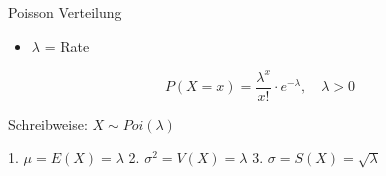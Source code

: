\begin{definition}{Poisson Verteilung}
\begin{itemize}
  \item $\lambda$ = Rate
\end{itemize}

$$P(X=x) = \frac{\lambda^x}{x!} \cdot e^{-\lambda}, \quad \lambda > 0$$

Schreibweise: $X \sim Poi(\lambda)$

1. $\mu = E(X) = \lambda$
2. $\sigma^2 = V(X) = \lambda$
3. $\sigma = S(X) = \sqrt{\lambda}$
\end{definition}
